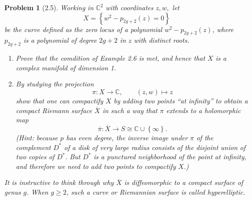\documentclass[11pt, letterpaper]{article}
\theoremstyle{plain}
\newtheorem{problem}{Problem}
\begin{document}
\begin{problem}[2.5]
	Working in $\mathbb{C} ^2$ with coordinates $z,w,$ let
	\[
		X=\left\{ w^2 - p_{2g+2} (z)=0 \right\} 
	\]
	be the curve defined as the zero locus of a polynomial $w^2-p_{2g+2} (z)$, where $p_{2g+2} $ is a polynomial of degree $2g+2$ in $z$ with distinct roots.
	\begin{enumerate}
		\item Prove that the comdition of Example 2.6 is met, and hence that $X$ is a complex manifold of dimension 1.
		\item By studying the projection
			\[
				\pi : X \to \mathbb{C} ,\qquad (z,w)\mapsto z
			\]
			show that one can compactify $X$ by adding two points ``at infinity'' to obtain a compact Riemann surface $\overline{X} $ in such a way that $\pi $ extends to a holomorphic map
			\[
				\overline{\pi } : \overline{X}  \to S \cong \mathbb{C} \cup \left\{ \infty  \right\} 
			.\]
			(Hint: because $p$ has even degree, the inverse image under $\pi $ of the complement $D^*$ of a disk of very large radius consists of the disjoint union of two copies of $D^*$. But $D^*$ is a punctured neighborhood of the point at infinity, and therefore we need to add two points to compactify $X$.)
	\end{enumerate}
	It is instructive to think through why $\overline{X} $ is diffeomorphic to a compact surface of genus $g$. When $g\geq 2$, such a curve or Riemannian surface is called hyperelliptic.
\end{problem}
\end{document}
